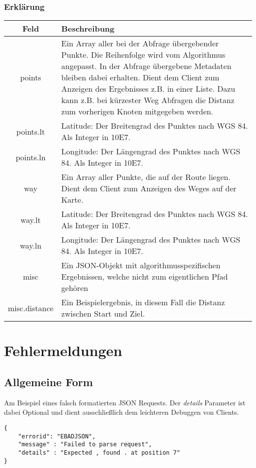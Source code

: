\documentclass[ngerman,titlepage,parskip=true]{scrartcl}
\begin{document}
		\subsubsection*{Erklärung}
		
		\begin{tabular}{|c|p{12cm}|}
			\hline
			\textbf{Feld} & \textbf{Beschreibung} \\ 
			\hline \hline
			
			points & Ein Array aller bei der Abfrage übergebender Punkte. Die Reihenfolge wird vom Algorithmus angepasst. In der Abfrage übergebene Metadaten bleiben dabei erhalten. Dient dem Client zum Anzeigen des Ergebnisses z.B. in einer Liste. Dazu kann z.B. bei kürzester Weg Abfragen die Distanz zum vorherigen Knoten mitgegeben werden.\\
			\hline
			
	    	points.lt & Latitude: Der Breitengrad des Punktes nach WGS 84. Als Integer in 10E7.\\ 
	    	\hline
	    	
	    	points.ln & Longitude: Der Längengrad des Punktes nach WGS 84. Als Integer in 10E7.\\
	    	\hline
	    	
	    	way & Ein Array aller Punkte, die auf der Route liegen. Dient dem Client zum Anzeigen des Weges auf der Karte.\\
			\hline
			
	    	way.lt & Latitude: Der Breitengrad des Punktes nach WGS 84. Als Integer in 10E7.\\ 
	    	\hline
	    	
	    	way.ln & Longitude: Der Längengrad des Punktes nach WGS 84. Als Integer in 10E7.\\
	    	\hline
	    	
	    	misc & Ein JSON-Objekt mit algorithmusspezifischen Ergebnissen, welche nicht zum eigentlichen Pfad gehören \\
	    	\hline
	    	
	    	misc.distance & Ein Beispielergebnis, in diesem Fall die Distanz zwischen Start und Ziel.\\
	    	\hline
		\end{tabular}

\section{Fehlermeldungen}
\subsection{Allgemeine Form}
Am Beispiel eines falsch formatierten JSON Requests.
Der \textit{details} Parameter ist dabei Optional und dient ausschließlich dem leichteren Debuggen von 
Clients.
	\begin{lstlisting}
{
	"errorid": "EBADJSON",
	"message" : "Failed to parse request",
	"details" : "Expected , found . at position 7"
}
	\end{lstlisting}
\end{document}
